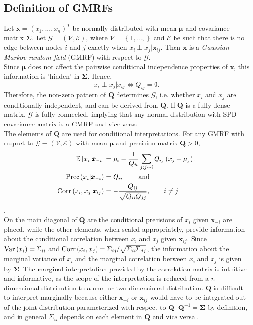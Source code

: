 \subsection{Definition of GMRFs}
Let $\pmb{x}=\left(x_1,...,x_n\right)^T$ be normally distributed with mean $\pmb{\mu}$ and covariance matrix $\pmb{\Sigma}$. Let $\mathcal{G}=\left(\mathcal{V}, \mathcal{E}\right)$, where $\mathcal{V}=\left\lbrace 1,...,\right\rbrace$ and $\mathcal{E}$ be such that there is no edge between nodes $i$ and $j$ exactly when $x_i\perp x_j|\pmb{x}_{ij}$. Then $\pmb{x}$ is a \textit{Gaussian Markov random field} (GMRF) with respect to $\mathcal{G}$. \\
Since $\pmb{\mu}$ does not affect the pairwise conditional independence properties of $\pmb{x}$, this information is 'hidden' in $\pmb{\Sigma}$. Hence,
\begin{equation*}
    x_i\perp x_j|x_{ij}\Longleftrightarrow Q_{ij}=0.
\end{equation*}
Therefore, the non-zero pattern of $\pmb{Q}$ determines $\mathcal{G}$, i.e. whether $x_i$ and $x_j$ are conditionally independent, and can be derived from $\pmb{Q}$. If $\pmb{Q}$ is a fully dense matrix, $\mathcal{G}$ is fully connected, implying that any normal distribution with SPD covariance matrix is a GMRF and vice versa. \\
The elements of $\pmb{Q}$ are used for conditional interpretations. For any GMRF with respect to $\mathcal{G}=\left(\mathcal{V}, \mathcal{E}\right)$ with mean $\pmb{\mu}$ and precision matrix $\pmb{Q} > 0$,
\begin{align}
    \mathbb{E}\left[x_i|\pmb{x}_{-i}\right] &= \mu_i-\frac{1}{Q_{ii}}\sum_{j:j\sim i}Q_{ij}\left(x_j-\mu_j\right), \label{eq:mean_gmrf}\\
    \hbox{Prec}\left(x_i|\pmb{x}_{-i}\right) &= Q_{ii} \hspace{20pt}\hbox{ and }\label{eq:prec_gmrf}\\
    \hbox{Corr}\left(x_i,x_j|\pmb{x}_{ij}\right) &= -\frac{Q_{ij}}{\sqrt{Q_{ii}Q_{jj}}},\hspace{20pt} i\neq j
\end{align}
\autocite[][21]{rue2005gaussian}. \\
On the main diagonal of $\pmb{Q}$ are the conditional precisions of $x_i$ given $\pmb{x}_{-i}$ are placed, while the other elements, when scaled appropriately, provide information about the conditional correlation between $x_i$ and $x_j$ given $\pmb{x}_{ij}$. Since $\hbox{Var}\left(x_i\right)=\Sigma_{ii}$ and $\hbox{Corr}\left(x_i,x_j\right)=\Sigma_{ij}/\sqrt{\Sigma_{ii}\Sigma_{jj}}$, the information about the marginal variance of $x_i$ and the marginal correlation between $x_i$ and $x_j$ is given by $\pmb{\Sigma}$. The marginal interpretation provided by the correlation matrix is intuitive and informative, as the scope of the interpretation is reduced from a $n$-dimensional distribution to a one- or two-dimensional distribution. $\pmb{Q}$ is difficult to interpret marginally because either $\pmb{x}_{-i}$ or $\pmb{x}_{ij}$ would have to be integrated out of the joint distribution parameterized with respect to $\pmb{Q}$. $\pmb{Q}^{-1}=\pmb{\Sigma}$ by definition, and in general $\Sigma_{ii}$ depends on each element in $\pmb{Q}$ and vice versa \autocite[][20--23]{rue2005gaussian}.
